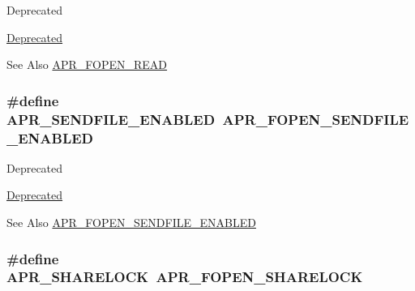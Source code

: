 \begin{DoxyRefDesc}{Deprecated}
\item[\hyperlink{deprecated__deprecated000017}{Deprecated}]\end{DoxyRefDesc}
\begin{DoxySeeAlso}{See Also}
\hyperlink{group__apr__file__open__flags_gaf9e7303f028b130ff7d4b209d6662d7d}{A\-P\-R\-\_\-\-F\-O\-P\-E\-N\-\_\-\-R\-E\-A\-D} 
\end{DoxySeeAlso}
\hypertarget{group__apr__file__open__flags_ga17e216aadb23254580258889e10c53f3}{
\subsubsection[{A\-P\-R\-\_\-\-S\-E\-N\-D\-F\-I\-L\-E\-\_\-\-E\-N\-A\-B\-L\-E\-D}]{\setlength{\rightskip}{0pt plus 5cm}\#define A\-P\-R\-\_\-\-S\-E\-N\-D\-F\-I\-L\-E\-\_\-\-E\-N\-A\-B\-L\-E\-D~{\bf A\-P\-R\-\_\-\-F\-O\-P\-E\-N\-\_\-\-S\-E\-N\-D\-F\-I\-L\-E\-\_\-\-E\-N\-A\-B\-L\-E\-D}}}\label{group__apr__file__open__flags_ga17e216aadb23254580258889e10c53f3}
\begin{DoxyRefDesc}{Deprecated}
\item[\hyperlink{deprecated__deprecated000029}{Deprecated}]\end{DoxyRefDesc}
\begin{DoxySeeAlso}{See Also}
\hyperlink{group__apr__file__open__flags_ga60c21e28e4a612d58a874fe2cc71a6e4}{A\-P\-R\-\_\-\-F\-O\-P\-E\-N\-\_\-\-S\-E\-N\-D\-F\-I\-L\-E\-\_\-\-E\-N\-A\-B\-L\-E\-D} 
\end{DoxySeeAlso}
\hypertarget{group__apr__file__open__flags_ga41277154f4f754a22287ed90e9466811}{
\subsubsection[{A\-P\-R\-\_\-\-S\-H\-A\-R\-E\-L\-O\-C\-K}]{\setlength{\rightskip}{0pt plus 5cm}\#define A\-P\-R\-\_\-\-S\-H\-A\-R\-E\-L\-O\-C\-K~{\bf A\-P\-R\-\_\-\-F\-O\-P\-E\-N\-\_\-\-S\-H\-A\-R\-E\-L\-O\-C\-K}}}\label{group__apr__file__open__flags_ga41277154f4f754a22287ed90e9466811}
